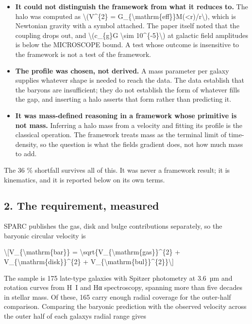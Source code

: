 \documentclass[
  10pt,
]{article}
\providecommand{\tightlist}{%
  \setlength{\itemsep}{0pt}\setlength{\parskip}{0pt}}
\begin{document}
\begin{itemize}
\tightlist
\item
  \textbf{It could not distinguish the framework from what it reduces
  to.} The halo was computed as \textbackslash(V\^{}\{2\} =
  G\_\{\textbackslash mathrm\{eff\}\}M(\textless r)/r\textbackslash),
  which is Newtonian gravity with a symbol attached. The paper itself
  noted that the coupling drops out, and \textbackslash(c\_\{g\}G
  \textbackslash sim 10\^{}\{-5\}\textbackslash) at galactic field
  amplitudes is below the MICROSCOPE bound. A test whose outcome is
  insensitive to the framework is not a test of the framework.
\item
  \textbf{The profile was chosen, not derived.} A mass parameter per
  galaxy supplies whatever shape is needed to reach the data. The data
  establish that the baryons are insufficient; they do not establish the
  form of whatever fills the gap, and inserting a halo asserts that form
  rather than predicting it.
\item
  \textbf{It was mass-defined reasoning in a framework whose primitive
  is not mass.} Inferring a halo mass from a velocity and fitting its
  profile is the classical operation. The framework treats mass as the
  terminal limit of time-density, so the question is what the
  field\textquotesingle s gradient does, not how much mass to add.
\end{itemize}

The 36 \% shortfall survives all of this. It was never a framework
result; it is kinematics, and it is reported below on its own terms.

\hypertarget{the-requirement-measured}{%
\subsection{2. The requirement,
measured}\label{the-requirement-measured}}

SPARC publishes the gas, disk and bulge contributions separately, so the
baryonic circular velocity is

\textbackslash{[}V\_\{\textbackslash mathrm\{bar\}\} =
\textbackslash sqrt\{V\_\{\textbackslash mathrm\{gas\}\}\^{}\{2\} +
V\_\{\textbackslash mathrm\{disk\}\}\^{}\{2\} +
V\_\{\textbackslash mathrm\{bul\}\}\^{}\{2\}\}\textbackslash{]}

The sample is 175 late-type galaxies with Spitzer photometry at 3.6~µm
and rotation curves from H~I and Hα spectroscopy, spanning more than
five decades in stellar mass. Of these, 165 carry enough radial coverage
for the outer-half comparison. Comparing the baryonic prediction with
the observed velocity across the outer half of each
galaxy\textquotesingle s radial range gives
\end{document}
